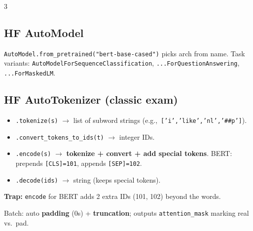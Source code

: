 \documentclass[8pt,a4paper,landscape]{extarticle}
\newcommand{\trap}[1]{{\small\colorbox{yellow!30}{\parbox{0.93\linewidth}{\textbf{\textcolor{red!70!black}{Trap:}} #1}}}}
\begin{document}
\begin{multicols*}{3}
    \subsection*{HF AutoModel}
    \texttt{AutoModel.from\_pretrained("bert-base-cased")} picks arch from name.
    Task variants: \texttt{AutoModelForSequenceClassification}, \texttt{...ForQuestionAnswering}, \texttt{...ForMaskedLM}.

    \subsection*{HF AutoTokenizer (classic exam)}
    \begin{itemize}
        \item \texttt{.tokenize(s)} $\to$ list of subword strings (e.g.,\ \texttt{['i','like','nl','\#\#p']}).
        \item \texttt{.convert\_tokens\_to\_ids(t)} $\to$ integer IDs.
        \item \texttt{.encode(s)} $\to$ \textbf{tokenize + convert + add special tokens}. BERT: prepends \texttt{[CLS]=101}, appends \texttt{[SEP]=102}.
        \item \texttt{.decode(ids)} $\to$ string (keeps special tokens).
    \end{itemize}
    \trap{\texttt{encode} for BERT adds 2 extra IDs (101, 102) beyond the words.}

    Batch: auto \textbf{padding} (0s) + \textbf{truncation}; outputs \texttt{attention\_mask} marking real vs.~pad.


\end{multicols*}
\end{document}
